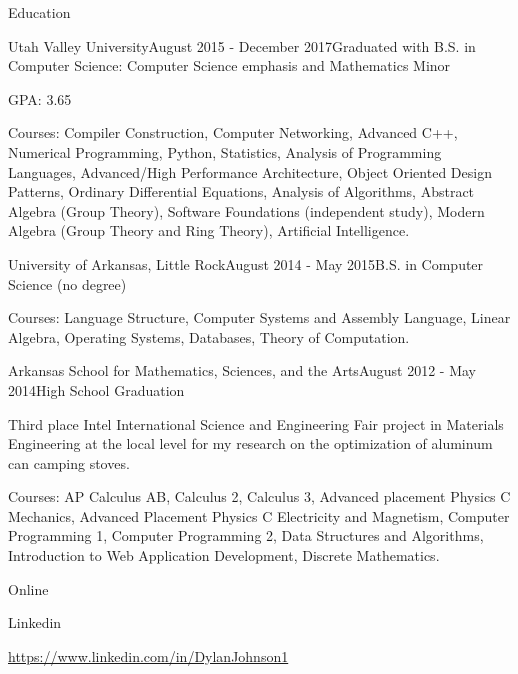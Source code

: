 \documentclass{resume} %
\begin{document}
\begin{rSection}{Education}

  \begin{rSubsection}{Utah Valley University}{August 2015 - December 2017}{Graduated with B.S. in Computer Science: Computer Science emphasis and Mathematics Minor}
  \item GPA: 3.65
  \item Courses: Compiler Construction, Computer Networking, Advanced C++, Numerical Programming, Python, Statistics, Analysis of Programming Languages, Advanced/High Performance Architecture, Object Oriented Design Patterns, Ordinary Differential Equations, Analysis of Algorithms, Abstract Algebra (Group Theory), Software Foundations (independent study), Modern Algebra (Group Theory and Ring Theory), Artificial Intelligence.
  \end{rSubsection}
  
  \begin{rSubsection}{University of Arkansas, Little Rock}{August 2014 - May 2015}{B.S. in Computer Science (no degree)}
  \item Courses: Language Structure, Computer Systems and Assembly Language, Linear Algebra, Operating Systems, Databases, Theory of Computation.
  \end{rSubsection}

  \begin{rSubsection}{Arkansas School for Mathematics, Sciences, and the Arts}{August 2012 - May 2014}{High School Graduation}
  \item Third place Intel International Science and Engineering Fair project in Materials Engineering at the local level for my research on the optimization of aluminum can camping stoves.
  \item Courses: AP Calculus AB, Calculus 2, Calculus 3, Advanced placement Physics C Mechanics, Advanced Placement Physics C Electricity and Magnetism, Computer Programming 1, Computer Programming 2, Data Structures and Algorithms, Introduction to Web Application Development, Discrete Mathematics.
  \end{rSubsection}

\end{rSection}

\begin{rSection}{Online}

  \begin{rSubsection}{Linkedin}{}{}{}
  \item {\href{https://www.linkedin.com/in/DylanJohnson1}{https://www.linkedin.com/in/DylanJohnson1}}
  \end{rSubsection}

\end{rSection}
\end{document}
